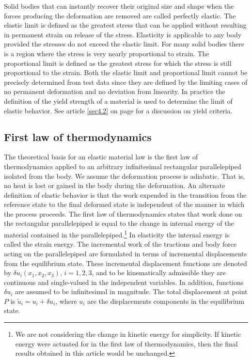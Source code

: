 \documentclass{AeroStructure-ERJohnson}
\begin{document}
Solid bodies that can instantly recover their original size and shape when the forces producing the deformation are removed are called perfectly elastic. The elastic limit is defined as the greatest stress that can be applied without resulting in permanent strain on release of the stress. Elasticity is applicable to any body provided the stresses do not exceed the elastic limit. For many solid bodies there is a region where the stress is very nearly proportional to strain. The proportional limit is defined as the greatest stress for which the stress is still proportional to the strain. Both the elastic limit and proportional limit cannot be precisely determined from test data since they are defined by the limiting cases of no permanent deformation and no deviation from linearity. In practice the definition of the yield strength of a material is used to determine the limit of elastic behavior. See article \ref{sec4.2} on page \pageref{sec4.2} for a discussion on yield criteria.

\subsection{First law of thermodynamics}\label{secA.3.1}

The theoretical basis for an elastic material law is the first law of thermodynamics applied to an arbitrary infinitesimal rectangular parallelepiped isolated from the body. We assume the deformation process is adiabatic. That is, no heat is lost or gained in the body during the deformation. An alternate definition of elastic behavior is that the work expended in the transition from the reference state to the final deformed state is independent of the manner in which the process proceeds. The first law of thermodynamics states that work done on the rectangular parallelepiped is equal to the change in internal energy of the material contained in the parallelepiped.\footnote{We are not considering the change in kinetic energy for simplicity. If kinetic energy were actuated for in the first law of thermodynamics, then the final results obtained in this article would be unchanged.} In elasticity the internal energy is called the strain energy. The incremental work of the tractions and body force acting on the parallelepiped are formulated in terms of incremental displacements from the equilibrium state. These incremental displacement functions are denoted by $\delta u_{i}(x_{1}, x_{2}, x_{3})$, $i=1,2,3$, and to be kinematically admissible they are continuous and single-valued in the independent variables. In addition, functions $\delta u_{i}$ are assumed to be infinitesimal in magnitude. The total displacement at point $P$ is $\tilde{u}_{i}=u_{i}+\delta u_{i}$, where $u_{i}$ are the displacements components in the equilibrium state.
\end{document}
